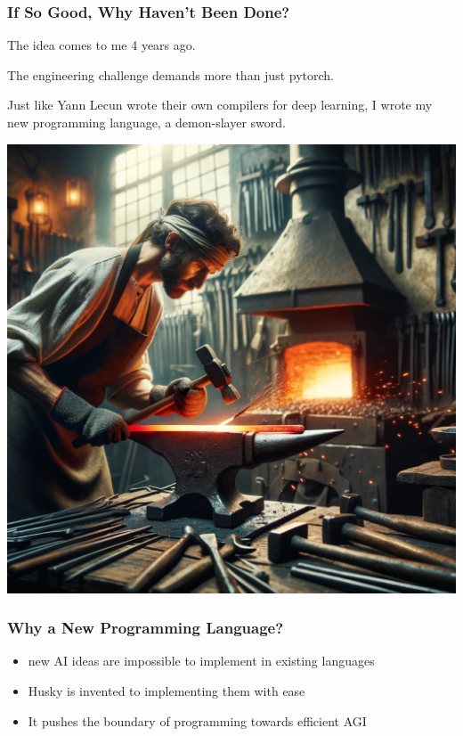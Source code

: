 \documentclass{beamer}   	%
\theoremstyle{definition}
\begin{document}
\begin{frame}
\frametitle{If So Good, Why Haven't Been Done?}
The idea comes to me 4 years ago.

The engineering challenge demands more than just pytorch.

Just like Yann Lecun wrote their own compilers for deep learning, I wrote my new programming language, a demon-slayer sword.

\begin{center}
\includegraphics[width=0.5\linewidth]{new_sword.png}
\end{center}
\end{frame}

\begin{frame}
\frametitle{Why a New Programming Language?}
\begin{itemize}
	\item new AI ideas are impossible to implement in existing languages
	\item Husky is invented to implementing them with ease
	\item It pushes the boundary of programming towards efficient AGI
\end{itemize}
\begin{center}
\end{center}
\end{frame}
\end{document}
